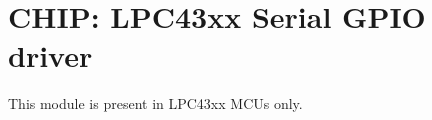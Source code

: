 \hypertarget{group___s_g_p_i_o__43_x_x}{}\section{C\+H\+IP\+: L\+P\+C43xx Serial G\+P\+IO driver}
\label{group___s_g_p_i_o__43_x_x}
This module is present in L\+P\+C43xx M\+C\+Us only. 